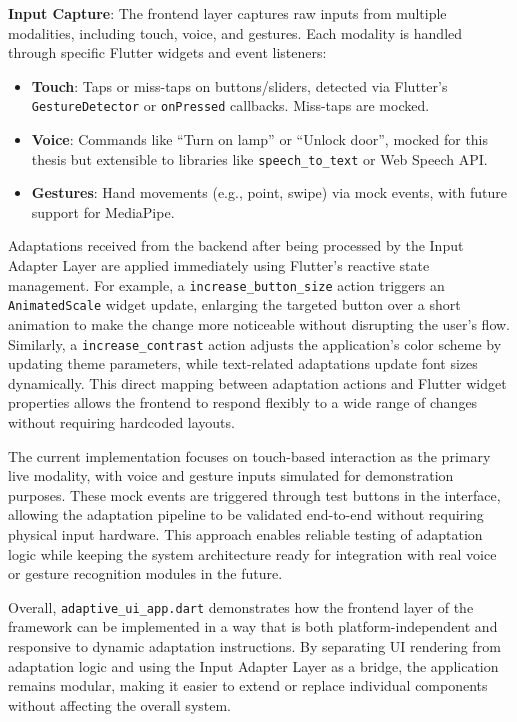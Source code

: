 \documentclass[openany]{book}
\begin{document}
\textbf{Input Capture}: The frontend layer captures raw inputs from multiple modalities, including touch, voice, and gestures. Each modality is handled through specific Flutter widgets and event listeners:
\begin{itemize}
    \item \textbf{Touch}: Taps or miss-taps on buttons/sliders, detected via Flutter’s \verb|GestureDetector| or \verb|onPressed| callbacks. Miss-taps are mocked.
    \item \textbf{Voice}: Commands like “Turn on lamp” or “Unlock door”, mocked for this thesis but extensible to libraries like \verb|speech_to_text| or Web Speech API.
    \item \textbf{Gestures}: Hand movements (e.g., point, swipe) via mock events, with future support for MediaPipe.
\end{itemize}

Adaptations received from the backend after being processed by the Input Adapter Layer are applied immediately using Flutter’s reactive state management. For example, a \texttt{increase\_button\_size} action triggers an \texttt{AnimatedScale} widget update, enlarging the targeted button over a short animation to make the change more noticeable without disrupting the user’s flow. Similarly, a \texttt{increase\_contrast} action adjusts the application’s color scheme by updating theme parameters, while text-related adaptations update font sizes dynamically. This direct mapping between adaptation actions and Flutter widget properties allows the frontend to respond flexibly to a wide range of changes without requiring hardcoded layouts.

The current implementation focuses on touch-based interaction as the primary live modality, with voice and gesture inputs simulated for demonstration purposes. These mock events are triggered through test buttons in the interface, allowing the adaptation pipeline to be validated end-to-end without requiring physical input hardware. This approach enables reliable testing of adaptation logic while keeping the system architecture ready for integration with real voice or gesture recognition modules in the future.

Overall, \texttt{adaptive\_ui\_app.dart} demonstrates how the frontend layer of the framework can be implemented in a way that is both platform-independent and responsive to dynamic adaptation instructions. By separating UI rendering from adaptation logic and using the Input Adapter Layer as a bridge, the application remains modular, making it easier to extend or replace individual components without affecting the overall system.
\end{document}
